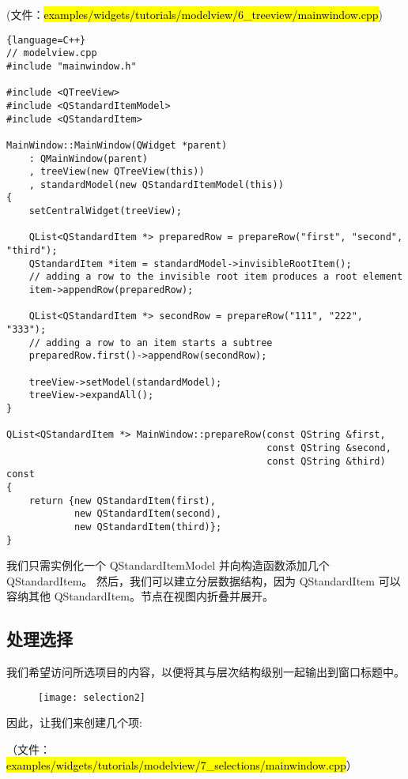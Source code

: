 (文件：\hl{examples/widgets/tutorials/modelview/6\_treeview/mainwindow.cpp})

\begin{lstlisting}{language=C++}
// modelview.cpp
#include "mainwindow.h"

#include <QTreeView>
#include <QStandardItemModel>
#include <QStandardItem>

MainWindow::MainWindow(QWidget *parent)
    : QMainWindow(parent)
    , treeView(new QTreeView(this))
    , standardModel(new QStandardItemModel(this))
{
    setCentralWidget(treeView);

    QList<QStandardItem *> preparedRow = prepareRow("first", "second", "third");
    QStandardItem *item = standardModel->invisibleRootItem();
    // adding a row to the invisible root item produces a root element
    item->appendRow(preparedRow);

    QList<QStandardItem *> secondRow = prepareRow("111", "222", "333");
    // adding a row to an item starts a subtree
    preparedRow.first()->appendRow(secondRow);

    treeView->setModel(standardModel);
    treeView->expandAll();
}

QList<QStandardItem *> MainWindow::prepareRow(const QString &first,
                                              const QString &second,
                                              const QString &third) const
{
    return {new QStandardItem(first),
            new QStandardItem(second),
            new QStandardItem(third)};
}
\end{lstlisting}

我们只需实例化一个 QStandardItemModel 并向构造函数添加几个 QStandardItem。
然后，我们可以建立分层数据结构，因为 QStandardItem 可以容纳其他 QStandardItem。节点在视图内折叠并展开。

\subsection{处理选择}

我们希望访问所选项目的内容，以便将其与层次结构级别一起输出到窗口标题中。

\begin{figure}[hbt!]  
\texttt{[image: selection2]}
\end{figure}

因此，让我们来创建几个项:

（文件： \hl{examples/widgets/tutorials/modelview/7\_selections/mainwindow.cpp}）

